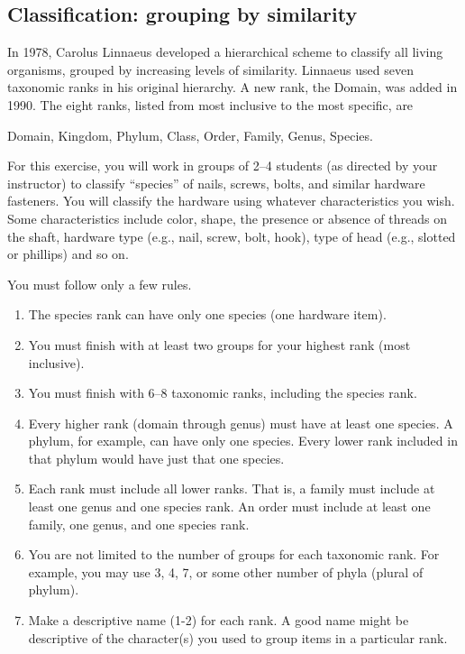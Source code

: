 \documentclass[12pt]{exam}
\newlength{\myindent}
\newcommand{\ind}{\hspace*{\myindent}}
\begin{document}
\subsection*{Classification: grouping by similarity }

In 1978, Carolus Linnaeus developed a hierarchical scheme to classify all living organisms, grouped by increasing levels of similarity. Linnaeus used seven taxonomic ranks in his original hierarchy. A new rank, the Domain, was added in 1990.  The eight ranks, listed from most inclusive to the most specific, are

\ind Domain, Kingdom, Phylum, Class, Order, Family, Genus, Species.

For this exercise, you will work in groups of 2–4 students (as directed by your instructor) to classify “species” of nails, screws, bolts, and similar hardware fasteners. You will classify the hardware using whatever characteristics you wish. Some characteristics include color, shape, the presence or absence of threads on the shaft, hardware type (e.g., nail, screw, bolt, hook), type of head (e.g., slotted or phillips) and so on. 

You must follow only a few rules.

\begin{enumerate}

	\item The species rank can have only one species (one hardware item). 
	
	\item You must finish with at least two groups for your highest rank (most inclusive).
	
	\item You must finish with 6–8 taxonomic ranks, including the species rank.
	
	\item Every higher rank (domain through genus) must have at least one species. A phylum, for example, can have only one species. Every lower rank included in that phylum would have just that one species.
	
	\item Each rank must include all lower ranks. That is, a family must include at least one genus and one species rank. An order must include at least one family, one genus, and one species rank.
	
	\item You are not limited to the number of groups for each taxonomic rank. For example, you may use 3, 4, 7, or some other number of  phyla (plural of phylum).
	
	\item Make a descriptive name (1-2) for each rank. A good name might be descriptive of the character(s) you used to group items in a particular rank.

\end{enumerate}
\end{document}

